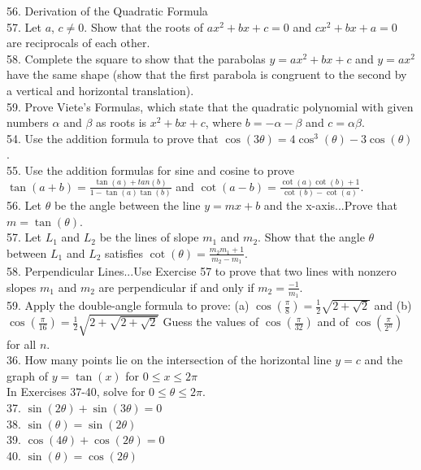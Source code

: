 \documentclass{article}
\begin{document}
56.  Derivation of the Quadratic Formula\\

57. Let $a$, $c \neq 0$. Show that the roots of $ax^2 + bx + c = 0$ and $cx^2 + bx + a = 0$ are reciprocals of each other.\\

58. Complete the square to show that the parabolas $y = ax^2 + bx + c$ and $y = ax^2$ have the same shape (show that the first parabola is congruent to the second by a vertical and horizontal translation).\\

59. Prove Viete's Formulas, which state that the quadratic polynomial with given numbers $\alpha$ and $\beta$ as roots is $x^2 + bx + c$, where $b = -\alpha - \beta$ and $c = \alpha\beta$.\\

54. Use the addition formula to prove that $\cos(3\theta)= 4\cos^3(\theta) - 3\cos(\theta)$.\\

55. Use the addition formulas for sine and cosine to prove $\tan(a + b) = \frac{\tan(a) + tan(b)}{1 - \tan(a)\tan(b)}$ and $\cot(a - b) = \frac{\cot(a)\cot(b) + 1}{\cot(b) - \cot(a)}$.\\

56. Let $\theta$ be the angle between the line $y = mx + b$ and the x-axis...Prove that $m = \tan(\theta)$.\\

57. Let $L_1$ and $L_2$ be the lines of slope $m_1$ and $m_2$. Show that the angle $\theta$ between $L_1$ and $L_2$ satisfies $\cot(\theta) = \frac{m_2m_1 + 1}{m_2 - m_1}$.\\

58. Perpendicular Lines...Use Exercise 57 to prove that two lines with nonzero slopes $m_1$ and $m_2$ are perpendicular if and only if $m_2 = \frac{-1}{m_1}$.\\

59. Apply the double-angle formula to prove: (a) $\cos(\frac{\pi}{8}) = \frac{1}{2}\sqrt{2 + \sqrt{2}}$ and (b) $\cos(\frac{\pi}{16}) = \frac{1}{2}\sqrt{2 + \sqrt{2 + \sqrt{2}}}$ Guess the values of $\cos(\frac{\pi}{32})$ and of $\cos(\frac{\pi}{2^n})$ for all $n$.\\

36. How many points lie on the intersection of the horizontal line $y = c$ and the graph of $y = \tan(x)$ for $0 \leq x \leq 2\pi$\\

In Exercises 37-40, solve for $0 \leq \theta \leq 2\pi$.\\
37. $\sin(2\theta) + \sin(3\theta) = 0$\\
38. $\sin(\theta) = \sin(2\theta)$\\
39. $\cos(4\theta) + \cos(2\theta) = 0$\\
40. $\sin(\theta) = \cos(2\theta)$\\
\end{document}
